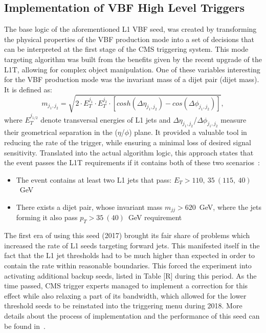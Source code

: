 \subsection{Implementation of VBF High Level Triggers}
\label{sec:vbf_implementation}
\hspace{10pt} The base logic of the aforementioned L1 VBF seed, was created by transforming the physical properties of the VBF production mode into a set of decisions that can be interpreted at the first stage of the CMS triggering system. This mode targeting algorithm was built from the benefits given by the recent upgrade of the L1T, allowing for complex object manipulation. One of these variables interesting for the VBF production mode was the invariant mass of a dijet pair (dijet mass). It is defined as:
\begin{equation}
    m_{j_1,j_2} = \sqrt{2\cdot E_T^{j_1}\cdot E_T^{j_2}\cdot [cosh(\Delta\eta_{j_1,j_2})-cos(\Delta\phi_{j_1,j_2})]},
\end{equation}
where $E_T^{j_{1/2}}$ denote transversal energies of L1 jets and $\Delta\eta_{j_1,j_2}$/$\Delta\phi_{j_1,j_2}$ measure their geometrical separation in the ($\eta$/$\phi$) plane. It provided a valuable tool in reducing the rate of the trigger, while ensuring a minimal loss of desired signal sensitivity. Translated into the actual algorithm logic, this approach states that the event passes the L1T requirements if it contains both of these two scenarios~\cite{cms:l1_paper}:
\begin{itemize}
    \item The event contains at least two L1 jets that pass: $E_T > 110,~35~(115,~40)$~GeV
    \item There exists a dijet pair, whose invariant mass $m_{jj}  > 620$~GeV, where the jets forming it also pass $p_T > 35~(40)$~GeV requirement
\end{itemize}
The first era of using this seed (2017) brought its fair share of problems which increased the rate of L1 seeds targeting forward jets. This manifested itself in the fact that the L1 jet thresholds had to be much higher than expected in order to contain the rate within reasonable boundaries. This forced the experiment into activating additional backup seeds, listed in Table [R] during this period. As the time passed, CMS trigger experts managed to implement a correction for this effect while also relaxing a part of its bandwidth, which allowed for the lower threshold seeds to be reinstated into the triggering menu during 2018. More details about the process of implementation and the performance of this seed can be found in~\cite{cms:l1_paper}\cite{Chiara}.

